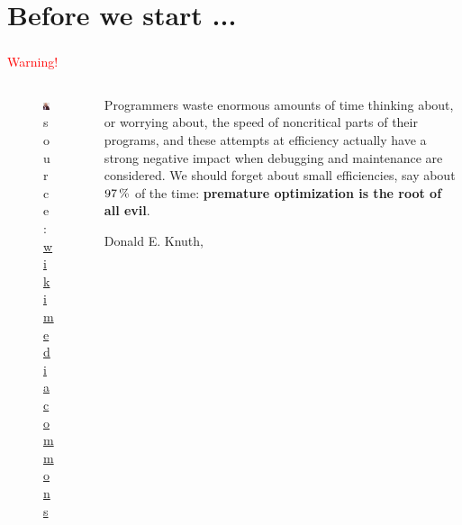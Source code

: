 \documentclass[9pt,xcolor=table]{beamer}
\begin{document}
\section*{Before we start ...}
\begin{frame}
\frametitle{\insertsection{}}
\begin{center}
  \huge\textcolor{red}{Warning!}
\end{center}
\begin{columns}[c]
  \begin{column}{.35\textwidth}
    \begin{figure}[htb]
      \includegraphics[width=\textwidth]{img/KnuthAtOpenContentAlliance}\\[6pt]\small
      source: \href{http://commons.wikimedia.org/wiki/File:KnuthAtOpenContentAlliance.jpg}{wikimedia commons}
    \end{figure}
  \end{column}
  \begin{column}{.6\textwidth}
    \large
    Programmers waste enormous amounts of time thinking about, or worrying about, the speed of noncritical parts of their programs, and these attempts at efficiency actually have a strong negative impact when debugging and maintenance are considered. We should forget about small efficiencies, say about $\unit[97]{\%}$ of the time: \textbf{premature optimization is the root of all evil}. \\[12pt]
    \begin{raggedright}
      \small{Donald E. Knuth, \cite{Knuth74structuredprogramming}}
    \end{raggedright}
  \end{column}
\end{columns}
\end{frame}
\end{document}
